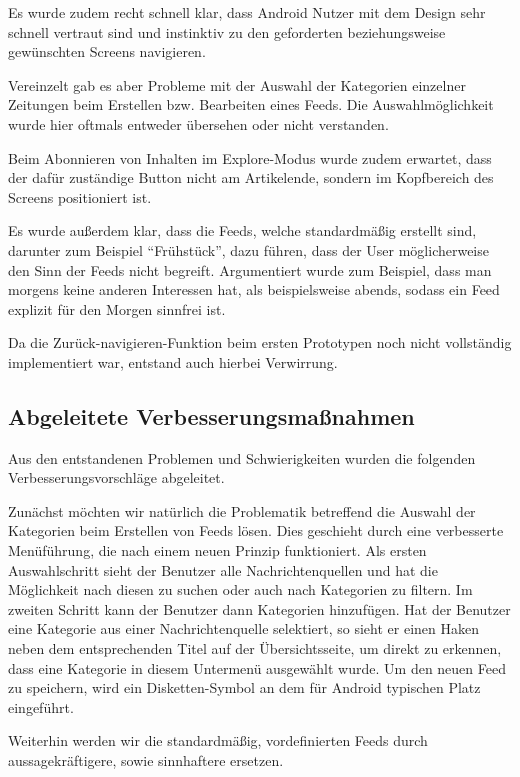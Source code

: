 Es wurde zudem recht schnell klar, dass Android Nutzer mit dem Design sehr schnell vertraut sind und instinktiv zu den geforderten beziehungsweise gewünschten Screens navigieren.

Vereinzelt gab es aber Probleme mit der Auswahl der Kategorien einzelner Zeitungen beim Erstellen bzw. Bearbeiten eines Feeds. Die Auswahlmöglichkeit wurde hier oftmals entweder übersehen oder nicht verstanden.

Beim Abonnieren von Inhalten im Explore-Modus wurde zudem erwartet, dass der dafür zuständige Button nicht am Artikelende, sondern im Kopfbereich des Screens positioniert ist.

Es wurde außerdem klar, dass die Feeds, welche standardmäßig erstellt sind, darunter zum Beispiel \enquote{Frühstück}, dazu führen, dass der User möglicherweise den Sinn der Feeds nicht begreift. Argumentiert wurde zum Beispiel, dass man morgens keine anderen Interessen hat, als beispielsweise abends, sodass ein Feed explizit für den Morgen sinnfrei ist.

Da die Zurück-navigieren-Funktion beim ersten Prototypen noch nicht vollständig implementiert war, entstand auch hierbei Verwirrung.

\subsection{Abgeleitete Verbesserungsmaßnahmen}

Aus den entstandenen Problemen und Schwierigkeiten wurden die folgenden Verbesserungsvorschläge abgeleitet.

Zunächst möchten wir natürlich die Problematik betreffend die Auswahl der Kategorien beim Erstellen von Feeds lösen. Dies geschieht durch eine verbesserte Menüführung, die nach einem neuen Prinzip funktioniert. Als ersten Auswahlschritt sieht der Benutzer alle Nachrichtenquellen und hat die Möglichkeit nach diesen zu suchen oder auch nach Kategorien zu filtern. Im zweiten Schritt kann der Benutzer dann Kategorien hinzufügen. Hat der Benutzer eine Kategorie aus einer Nachrichtenquelle selektiert, so sieht er einen Haken neben dem entsprechenden Titel auf der Übersichtsseite, um direkt zu erkennen, dass eine Kategorie in diesem Untermenü ausgewählt wurde. Um den neuen Feed zu speichern, wird ein Disketten-Symbol an dem für Android typischen Platz eingeführt.

Weiterhin werden wir die standardmäßig, vordefinierten Feeds durch aussagekräftigere, sowie sinnhaftere ersetzen.

